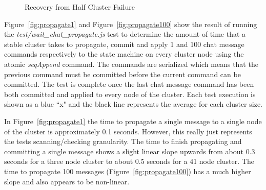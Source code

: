 \documentclass[conference,compsoc]{./IEEEtran/IEEEtran}
\begin{document}
\begin{figure}[!t]
    \caption{Recovery from Half Cluster Failure}
    \label{fig:recovery_half_failure}
\end{figure}



Figure~\ref{fig:propagate1} and Figure~\ref{fig:propagate100} show the result of running the \emph{test/wait\_chat\_propagate.js} test to determine the amount of time that a stable cluster takes to propagate, commit and apply 1 and 100 chat message commands respectively to the state machine on every cluster node using the atomic \emph{seqAppend} command. The commands are serialized which means that the previous command must be committed before the current command can be committed.  The test is complete once the last chat message command has been both committed and applied to every node of the cluster. Each test execution is shown as a blue ``x" and the black line represents the average for each cluster size.

In Figure~\ref{fig:propagate1} the time to propagate a single message to a single node of the cluster is approximately 0.1 seconds. However, this really just represents the tests scanning/checking granularity.  The time to finish propagating and committing a single message shows a slight linear slope upwards from about 0.3 seconds for a three node cluster to about 0.5 seconds for a 41 node cluster. The time to propagate 100 messages (Figure~\ref{fig:propagate100}) has a much higher slope and also appears to be non-linear.
\end{document}
